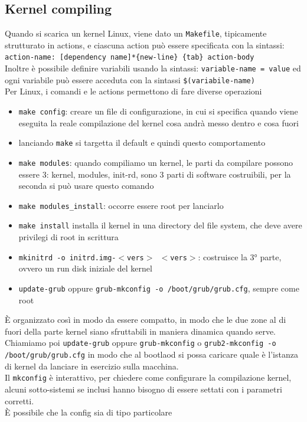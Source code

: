\documentclass[12pt, oneside]{extbook}
\begin{document}
\subsection{Kernel compiling}
Quando si scarica un kernel Linux, viene dato un \texttt{Makefile}, tipicamente strutturato in actions, e ciascuna action può essere specificata con la sintassi: \texttt{action-name: [dependency name]*\{new-line\} \{tab\} action-body}\\
Inoltre è possibile definire variabili usando la sintassi: \texttt{variable-name = value} ed ogni variabile può essere acceduta con la sintassi \texttt{\$(variabile-name)}\\ Per Linux, i comandi e le actions permettono di fare diverse operazioni
\begin{itemize}
\item \texttt{make config}: creare un file di configurazione, in cui si specifica quando viene eseguita la reale compilazione del kernel cosa andrà messo dentro e cosa fuori
\item lanciando \texttt{make} si targetta il default e quindi questo comportamento
\item \texttt{make modules}: quando compiliamo un kernel, le parti da compilare possono essere 3: kernel, modules, init-rd, sono 3 parti di software costruibili, per la seconda si può usare questo comando
\item \texttt{make modules\_install}: occorre essere root per lanciarlo
\item \texttt{make install} installa il kernel in una directory del file system, che deve avere privilegi di root in scrittura
\item \texttt{mkinitrd -o initrd.img-$<$vers$>$ $<$vers$>$}: costruisce la 3° parte, ovvero un run disk iniziale del kernel
\item \texttt{update-grub} oppure \texttt{grub-mkconfig -o /boot/grub/grub.cfg}, sempre come root
\end{itemize}
È organizzato così in modo da essere compatto, in modo che le due zone al di fuori della parte kernel siano sfruttabili in maniera dinamica quando serve. Chiamiamo poi \texttt{update-grub} oppure \texttt{grub-mkconfig} o \texttt{grub2-mkconfig -o /boot/grub/grub.cfg} in modo che al bootlaod si possa caricare quale è l'istanza di kernel da lanciare in esercizio sulla macchina.\\ Il \texttt{mkconfig} è interattivo, per chiedere come configurare la compilazione kernel, alcuni sotto-sistemi se inclusi hanno bisogno di essere settati con i parametri corretti.\\ È possibile che la config sia di tipo particolare
\end{document}
